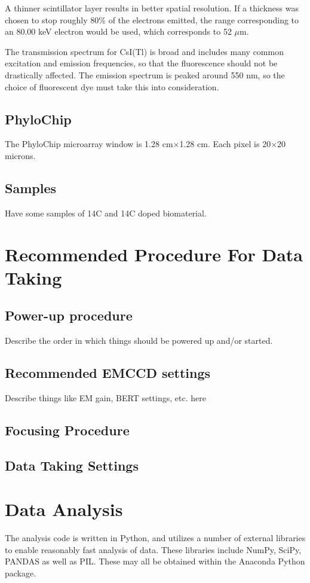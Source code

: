\documentclass[11pt]{amsart}
\begin{document}
A thinner scintillator layer results in better spatial resolution.  If a thickness was chosen to stop roughly 80\% of the electrons emitted, the range corresponding to an 80.00 keV electron would be used, which corresponds to 52 $\mu$m. 

The transmission spectrum for CsI(Tl) is broad and includes many common excitation and emission frequencies, so that the fluorescence should not be drastically affected.  The emission spectrum is peaked around 550 nm, so the choice of fluorescent dye must take this into consideration.  

\subsection{PhyloChip}\label{sec:phylo}
The PhyloChip microarray window is 1.28 cm$\times$1.28 cm. Each pixel is 20$\times$20 microns.
\subsection{Samples}
Have some samples of 14C and 14C doped biomaterial.



\section{Recommended Procedure For Data Taking}
\subsection{Power-up procedure}
Describe the order in which things should be powered up and/or started.
\subsection{Recommended EMCCD settings}
Describe things like EM gain, BERT settings, etc. here
\subsection{Focusing Procedure}
\subsection{Data Taking Settings}

\section{Data Analysis}
The analysis code is written in Python, and utilizes a number of external libraries to enable reasonably fast analysis of data. These libraries include NumPy, SciPy, PANDAS as well as PIL. 
These may all be obtained within the Anaconda Python package. 
\end{document}
